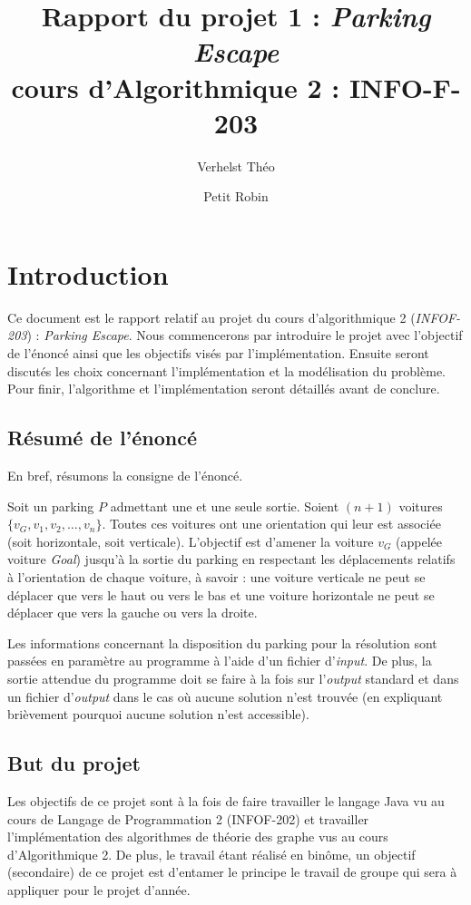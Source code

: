 \documentclass{article}
\title{Rapport du projet 1 : \textit{Parking Escape}\\cours d'Algorithmique 2 : INFO-F-203}
\author{Verhelst Théo \and Petit Robin}
\begin{document}
\maketitle
\tableofcontents
\newpage
{}

\section{Introduction}
    Ce document est le rapport relatif au projet du cours d'algorithmique 2 (\textit{INFOF-203}) : \textit{Parking Escape}. Nous commencerons par
    introduire le projet avec l'objectif de l'énoncé ainsi que les objectifs visés par l'implémentation. Ensuite seront discutés les choix concernant
    l'implémentation et la modélisation du problème. Pour finir, l'algorithme et l'implémentation seront détaillés avant de conclure.

    \subsection{Résumé de l'énoncé}
        En bref, résumons la consigne de l'énoncé.

        Soit un parking $P$ admettant une et une seule sortie. Soient $(n+1)$ voitures $\{v_G, v_1, v_2, \ldots, v_n\}$. Toutes ces voitures ont une
        orientation qui leur est associée (soit horizontale, soit verticale). L'objectif est d'amener la voiture $v_G$ (appelée voiture \textit{Goal})
        jusqu'à la sortie du parking en respectant les déplacements relatifs à l'orientation de chaque voiture, à savoir : une voiture verticale ne peut
        se déplacer que vers le haut ou vers le bas et une voiture horizontale ne peut se déplacer que vers la gauche ou vers la droite.

        Les informations concernant la disposition du parking pour la résolution sont passées en paramètre au programme à l'aide d'un fichier d'\textit{input}.
        De plus, la sortie attendue du programme doit se faire à la fois sur l'\textit{output} standard et dans un fichier d'\textit{output} dans le cas où
        aucune solution n'est trouvée (en expliquant brièvement pourquoi aucune solution n'est accessible).

    \subsection{But du projet}
        Les objectifs de ce projet sont à la fois de faire travailler le langage Java vu au cours de Langage de Programmation 2 (INFOF-202) et
        travailler l'implémentation des algorithmes de théorie des graphe vus au cours d'Algorithmique 2. De plus, le travail étant réalisé en binôme,
        un objectif (secondaire) de ce projet est d'entamer le principe le travail de groupe qui sera à appliquer pour le projet d'année.
\end{document}
